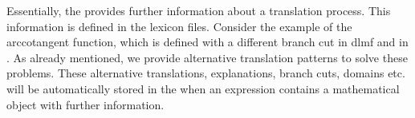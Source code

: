 Essentially, the  provides further information about a translation process. This information is defined in the lexicon files. Consider the example of the arccotangent function, which is defined with a different branch cut in \gls{dlmf} and in \Maple. As already mentioned, we provide alternative translation patterns to solve these problems. These alternative translations, explanations, branch cuts, domains etc. will be automatically stored in the  when an expression contains a mathematical object with further information.